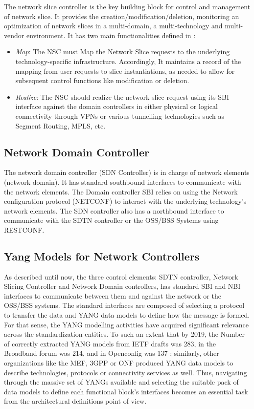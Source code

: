 \documentclass[journal,article,submit,moreauthors,pdftex]{Definitions/mdpi}
\begin{document}
The network slice controller is the key building block for control and management of network slice. It provides the creation/modification/deletion, monitoring an optimization of network slices in a multi-domain, a multi-technology and multi-vendor environment. It has two main functionalities defined in \cite{contreras2020slice,slicing2021framework}:
\begin{itemize}
    \item \textit{Map}: The NSC must Map the Network Slice requests to the underlying technology-specific infrastructure. Accordingly, It maintains a record of the mapping from user requests to slice instantiations, as needed to allow for subsequent control functions like modification or deletion.
    \item  \textit{Realize}: The NSC should realize the network slice request using its SBI interface against the domain controllers in either physical or logical connectivity through VPNs or various tunnelling technologies such as Segment Routing, MPLS, etc. 
\end{itemize}

\subsection{Network Domain Controller} 

The network domain controller (SDN Controller) is in charge of network elements (network domain). It has standard southbound interfaces to communicate with the network elements. The Domain controller SBI relies on using the Network configuration protocol (NETCONF) to interact with the underlying technology's network elements. The SDN controller also has a northbound interface to communicate with the SDTN controller or the OSS/BSS Systems using RESTCONF.

\subsection{Yang Models for Network Controllers}

As described until now, the three control elements: SDTN controller, Network Slicing Controller and Network Domain controllers, has standard SBI and NBI interfaces to communicate between them and against the network or the OSS/BSS systems. The standard interfaces are composed of selecting a protocol to transfer the data and YANG data models to define how the message is formed. For that sense, the YANG modelling activities have acquired significant relevance across the standardization entities. To such an extent that by 2019, the Number of correctly extracted YANG models from IETF drafts was 283, in the Broadband forum was 214, and in Openconfig was 137 \cite{benoit2020yang}; similarly, other organizations like the MEF, 3GPP or ONF produced YANG data models to describe technologies, protocols or connectivity services as well. Thus, navigating through the massive set of YANGs available and selecting the suitable pack of data models to define each functional block's interfaces becomes an essential task from the architectural definitions point of view. 
\end{document}
